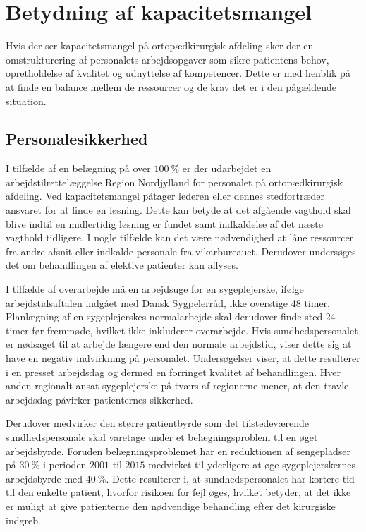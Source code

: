 \section{Betydning af kapacitetsmangel}
Hvis der ser kapacitetsmangel på ortopædkirurgisk afdeling sker der en omstrukturering af personalets arbejdsopgaver som sikre patientens behov, opretholdelse af kvalitet og udnyttelse af kompetencer. Dette er med henblik på at finde en balance mellem de ressourcer og de krav det er i den pågældende situation. \cite{Bjerg2016} 

\subsection{Personalesikkerhed} \label{Per_sik}

I tilfælde af en belægning på over $100~\%$ er der udarbejdet en arbejdstilrettelæggelse Region Nordjylland for personalet på ortopædkirurgisk afdeling. Ved kapacitetsmangel påtager lederen eller dennes stedfortræder ansvaret for at finde en løsning. Dette kan betyde at det afgående vagthold skal blive indtil en midlertidig løsning er fundet samt indkaldelse af det næste vagthold tidligere. I nogle tilfælde kan det være nødvendighed at låne ressourcer fra andre afsnit eller indkalde personale fra vikarbureauet. Derudover undersøges det om behandlingen af elektive patienter kan aflyses. \cite{Bjerg2016}

I tilfælde af overarbejde må en arbejdsuge for en sygeplejerske, ifølge arbejdstidsaftalen indgået med Dansk Sygpelerråd, ikke overstige 48 timer. Planlægning af en sygeplejerskes normalarbejde skal derudover finde sted 24 timer før fremmøde, hvilket ikke inkluderer overarbejde. \cite{Danske2015}  Hvis sundhedspersonalet er nødsaget til at arbejde længere end den normale arbejdstid, viser dette sig at have en negativ indvirkning på personalet.\cite{Kjeldsen2015,Dinges2004} Undersøgelser viser, at dette resulterer i en presset arbejdsdag og dermed en forringet kvalitet af behandlingen. Hver anden regionalt ansat sygeplejerske på tværs af regionerne mener, at den travle arbejdsdag påvirker patienternes sikkerhed.\cite{Kjeldsen2015} 

Derudover medvirker den større patientbyrde som det tilstedeværende sundhedspersonale skal varetage under et belægningsproblem til en øget arbejdsbyrde.  Foruden belægningsproblemet har en reduktionen af sengepladser på $30~\%$ i perioden $2001$ til $2015$ medvirket til yderligere at øge sygeplejerskernes arbejdsbyrde med $40~\%$. Dette resulterer i, at sundhedspersonalet har kortere tid til den enkelte patient, hvorfor risikoen for fejl øges, hvilket betyder, at det ikke er muligt at give patienterne den nødvendige behandling efter det kirurgiske indgreb.\cite{Dinges2004,Aiken2002} 


